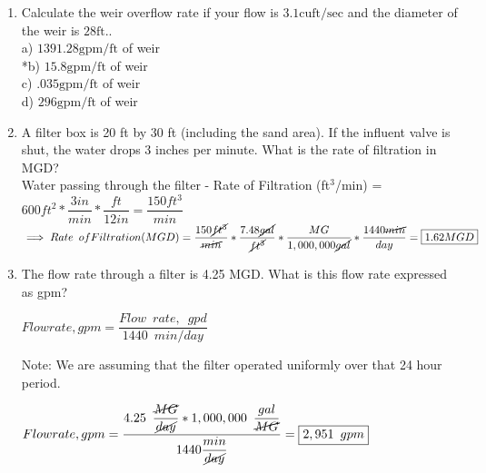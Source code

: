 \documentclass{article}
\begin{document}
\begin{enumerate}
  \item Calculate the weir overflow rate if your flow is $3.1 \mathrm{cuft} / \mathrm{sec}$ and the diameter of the weir is $28 \mathrm{ft}$..\\
a) $1391.28 \mathrm{gpm} / \mathrm{ft}$ of weir\\
*b) $15.8 \mathrm{gpm} / \mathrm{ft}$ of weir\\
c) $.035 \mathrm{gpm} / \mathrm{ft}$ of weir\\
d) $296 \mathrm{gpm} / \mathrm{ft}$ of weir\\

\item A filter box is 20 ft by 30 ft (including the sand area). If the influent valve is shut, the water drops 3 inches per minute. What is the rate of filtration in MGD?\\
\vspace{0.2cm}
Water passing through the filter - Rate of Filtration (ft$^3$/min) = $600ft^2*\dfrac{3in}{min}*\dfrac{ft}{12in}=\dfrac{150ft^3}{min}$\\
\vspace{0.2cm}
$\implies Rate \enspace of Filtration(MGD)=\dfrac{150\cancel{ft^3}}{\cancel{min}}*\dfrac{7.48\cancel{gal}}{\cancel{ft^3}}*\dfrac{MG}{1,000,000\cancel{gal}}*\dfrac{1440\cancel{min}}{day}=\boxed{1.62MGD}$


 

 

\item The flow rate through a filter is 4.25 MGD. What is this flow rate expressed as gpm?\\

\vspace{0.2cm}

$Flow rate, gpm=\dfrac{Flow \enspace rate, \enspace gpd}{1440 \enspace min/day}$\\

\vspace{0.2cm}

Note:  We are assuming that the filter operated uniformly over that 24 hour period.\\

\vspace{0.3cm}

$Flow rate, gpm=\dfrac{4.25 \enspace \dfrac{\cancel{MG}}{\cancel{day}} *1,000,000 \enspace \dfrac{gal}{\cancel{MG}}}{1440\dfrac{min}{\cancel{day}}}=\boxed{2,951 \enspace gpm}$

 

\vspace{0.3cm}


\end{enumerate}
\end{document}
